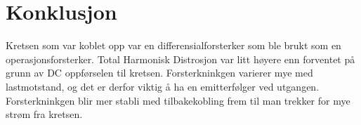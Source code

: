 
\section{Konklusjon}
\label{konklusjon}

Kretsen som var koblet opp var en differensialforsterker som ble brukt som en operasjonsforsterker. Total Harmonisk Distrosjon var litt høyere enn forventet på grunn av DC oppførselen til kretsen. Forsterkninkgen varierer mye med lastmotstand, og det er derfor viktig å ha en emitterfølger ved utgangen. Forsterkninkgen blir mer stabli med tilbakekobling frem til man trekker for mye strøm fra kretsen.